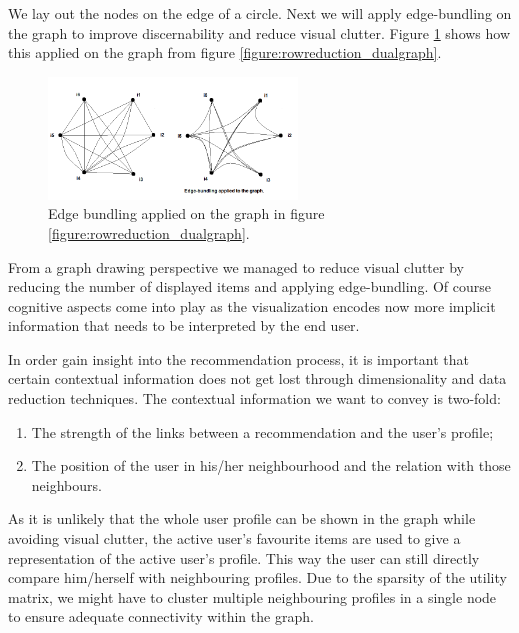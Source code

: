 We lay out the nodes on the edge of a circle. Next we will apply edge-bundling on the graph to improve discernability and reduce visual clutter\cite{Holten:2006:HEB:1187627.1187772, holten:2009}. Figure \ref{figure:edgebundling_dualgraph} shows how this applied on the graph from figure \ref{figure:rowreduction_dualgraph}.

\begin{figure}%
	\begin{center}
		\includegraphics[width=250px]{img/dualgraph_edgebundling}%
	\end{center}
	\caption{Edge bundling applied on the graph in figure \ref{figure:rowreduction_dualgraph}.}%
	\label{figure:edgebundling_dualgraph}%
\end{figure}

From a graph drawing perspective we managed to reduce visual clutter by reducing the number of displayed items and applying edge-bundling\cite{herman:2000, Holten:2006:HEB:1187627.1187772}.  Of course cognitive aspects come into play as the visualization encodes now more implicit information that needs to be interpreted by the end user\cite{herman:2000, ware:2004}.

In order gain insight into the recommendation process, it is important that certain contextual information does not get lost through dimensionality and data reduction techniques. The contextual information we want to convey is two-fold:

\begin{enumerate}
	\item The strength of the links between a recommendation and the user's profile;
	\item The position of the user in his/her neighbourhood and the relation with those neighbours.
\end{enumerate}

As it is unlikely that the whole user profile can be shown in the graph while avoiding visual clutter, the active user's favourite items are used to give a representation of the active user's profile. This way the user can still directly compare him/herself with neighbouring profiles. Due to the sparsity of the utility matrix, we might have to cluster multiple neighbouring profiles in a single node to ensure adequate connectivity within the graph.


